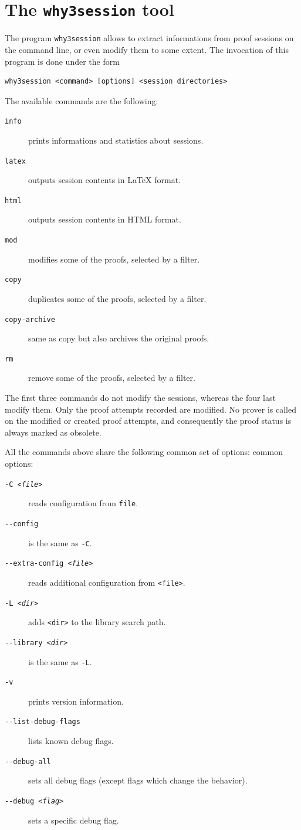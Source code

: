 \section{The \texttt{why3session} tool}
\label{sec:why3session}

The program \texttt{why3session} allows to extract informations from
proof sessions on the command line, or even modify them to some
extent. The invocation of this program is done under the form
\begin{verbatim}
why3session <command> [options] <session directories>
\end{verbatim}
The available commands are the following:
\begin{description}
\item[\texttt{info}] prints informations and statistics about sessions.
\item[\texttt{latex}] outputs session contents in LaTeX format.
\item[\texttt{html}] outputs session contents in HTML format.
\item[\texttt{mod}] modifies some of the proofs, selected by a filter.
\item[\texttt{copy}] duplicates some of the proofs, selected by a filter.
\item[\texttt{copy-archive}] same as copy but also archives the
  original proofs.
\item[\texttt{rm}] remove some of the proofs, selected by a filter.
\end{description}

The first three commands do not modify the sessions, whereas the four
last modify them. Only the proof attempts recorded are modified. No
prover is called on the modified or created proof attempts, and
consequently the proof status is always marked as obsolete.

All the commands above share the following common set of options:
common options:
\begin{description}
\item[\texttt{-C \textsl{<file>}}] reads configuration from \texttt{file}.
\item[\texttt{-{}-config}] is the same as \texttt{-C}.
\item[\texttt{-{}-extra-config \textsl{<file>}}] reads additional configuration from \texttt{<file>}.
\item[\texttt{-L \textsl{<dir>}}] adds \texttt{<dir>} to the library search path.
\item[\texttt{-{}-library \textsl{<dir>}}] is the same as \texttt{-L}.
\item[\texttt{-v}] prints version information.
\item[\texttt{-{}-list-debug-flags}] lists known debug flags.
\item[\texttt{-{}-debug-all}] sets all debug flags (except flags which change the behavior).
\item[\texttt{-{}-debug \textsl{<flag>}}] sets a specific debug flag.
\end{description}

